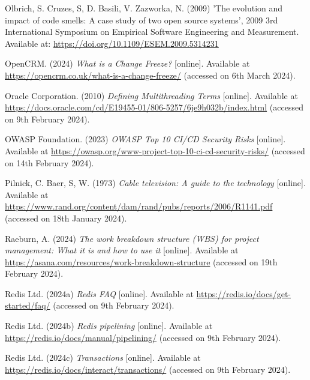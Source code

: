 \noindent Olbrich, S. Cruzes, S, D. Basili, V. Zazworka, N. (2009) 'The evolution and impact of code smells: A case study of two open source systems', 2009 3rd International Symposium on Empirical Software Engineering and Measurement. Available at: \url{https://doi.org/10.1109/ESEM.2009.5314231}
\vspace{0.2cm}

\noindent OpenCRM. (2024) \textit{What is a Change Freeze?} [online]. Available at \url{https://opencrm.co.uk/what-is-a-change-freeze/} (accessed on 6th March 2024).
\vspace{0.2cm}

\noindent Oracle Corporation. (2010) \textit{Defining Multithreading Terms} [online]. Available at \url{https://docs.oracle.com/cd/E19455-01/806-5257/6je9h032b/index.html} (accessed on 9th February 2024).
\vspace{0.2cm}

\noindent OWASP Foundation. (2023) \textit{OWASP Top 10 CI/CD Security Risks} [online]. Available at \url{https://owasp.org/www-project-top-10-ci-cd-security-risks/} (accessed on 14th February 2024).
\vspace{0.2cm}

\noindent Pilnick, C. Baer, S, W. (1973) \textit{Cable television: A guide to the technology} [online]. Available at \url{https://www.rand.org/content/dam/rand/pubs/reports/2006/R1141.pdf} (accessed on 18th January 2024).
\vspace{0.2cm}

\noindent Raeburn, A. (2024) \textit{The work breakdown structure (WBS) for project management: What it is and how to use it} [online]. Available at \url{https://asana.com/resources/work-breakdown-structure} (accessed on 19th February 2024).
\vspace{0.2cm}

\noindent Redis Ltd. (2024a) \textit{Redis FAQ} [online]. Available at \url{https://redis.io/docs/get-started/faq/} (accessed on 9th February 2024).
\vspace{0.2cm}

\noindent Redis Ltd. (2024b) \textit{Redis pipelining} [online]. Available at \url{https://redis.io/docs/manual/pipelining/} (accessed on 9th February 2024).
\vspace{0.2cm}

\noindent Redis Ltd. (2024c) \textit{Transactions} [online]. Available at \url{https://redis.io/docs/interact/transactions/} (accessed on 9th February 2024).
\vspace{0.2cm}

